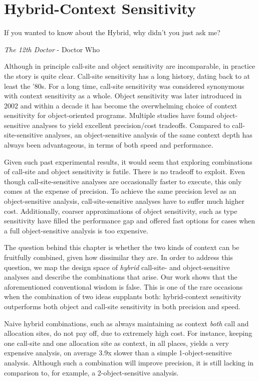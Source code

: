 \chapter{Hybrid-Context Sensitivity}
\label{chapter:hybrid}
\epigraph{If you wanted to know about the Hybrid, why didn’t you just ask me?}{\textit{The 12th Doctor} - Doctor Who}

Although in principle call-site and object sensitivity are incomparable, in practice the story is quite clear. Call-site sensitivity has a long history, dating back to at least the '80s. For a long time, call-site sensitivity was considered synonymous with context sensitivity as a whole. Object sensitivity was later introduced in 2002 \cite{issta:2002:Milanova} and within a decade it has become the overwhelming choice of context sensitivity for object-oriented programs. Multiple studies \cite{pldi:2006:Naik,paste:2005:Liang,thesis:Lhotak,article:2008:tosem:Lhotak,oopsla:2009:Bravenboer} have found object-sensitive analyses to yield excellent precision/cost tradeoffs. Compared to call-site-sensitive analyses, an object-sensitive analysis of the same context depth has always been advantageous, in terms of both speed and performance.

Given such past experimental results, it would seem that exploring combinations of call-site and object sensitivity is futile. There is no tradeoff to exploit. Even though call-site-sensitive analyses are occasionally faster to execute, this only comes at the expense of precision. To achieve the same precision level as an object-sensitive analysis, call-site-sensitive analyses have to suffer much higher cost. Additionally, coarser approximations of object sensitivity, such as type sensitivity \cite{popl:2011:Smaragdakis} have filled the performance gap and offered fast options for cases when a full object-sensitive analysis is too expensive.

The question behind this chapter is whether the two kinds of context can be fruitfully combined, given how dissimilar they are. In order to address this question, we map the design space of \emph{hybrid} call-site- and object-sensitive analyses and describe the combinations that arise. Our work shows that the aforementioned conventional wisdom is false. This is one of the rare occasions when the combination of two ideas supplants both: hybrid-context sensitivity outperforms both object and call-site sensitivity in both precision and speed.

Naive hybrid combinations, such as always maintaining as context \emph{both} call and allocation sites, do not pay off, due to extremely high cost. For instance, keeping one call-site and one allocation site as context, in all places, yields a very expensive analysis, on average 3.9x slower than a simple 1-object-sensitive analysis. Although such a combination will improve precision, it is still lacking in comparison to, for example, a 2-object-sensitive analysis.

